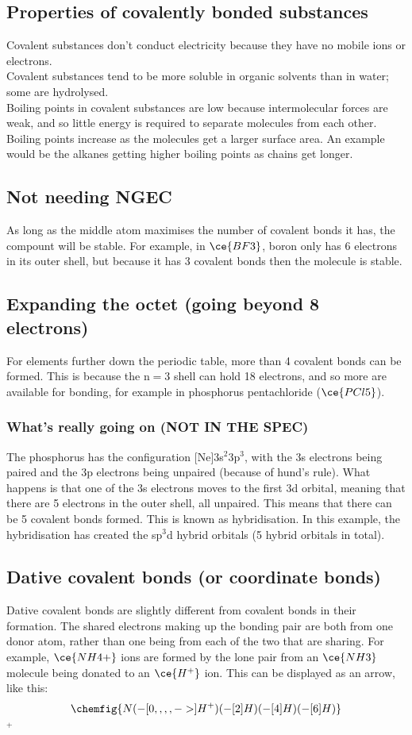 \subsection{Properties of covalently bonded substances}
Covalent substances don't conduct electricity because they have no mobile ions or electrons.
\\
Covalent substances tend to be more soluble in organic solvents than in water; some are hydrolysed.
\\
Boiling points in covalent substances are low because intermolecular forces are weak, and so little energy is required to separate molecules from each other. Boiling points increase as the molecules get a larger surface area. An example would be the alkanes getting higher boiling points as chains get longer.

\subsection{Not needing NGEC}
As long as the middle atom maximises the number of covalent bonds it has, the compount will be stable. For example, in $\ce{BF3}$, boron only has 6 electrons in its outer shell, but because it has 3 covalent bonds then the molecule is stable.
\subsection{Expanding the octet (going beyond 8 electrons)}
For elements further down the periodic table, more than 4 covalent bonds can be formed. This is because the n$=3$ shell can hold 18 electrons, and so more are available for bonding, for example in phosphorus pentachloride ($\ce{PCl5}$).
\subsubsection{What's really going on (NOT IN THE SPEC)}
The phosphorus has the configuration [Ne]3s$^2$3p$^3$, with the 3s electrons being paired and the 3p electrons being unpaired (because of hund's rule). What happens is that one of the 3s electrons moves to the first 3d orbital, meaning that there are 5 electrons in the outer shell, all unpaired. This means that there can be 5 covalent bonds formed. This is known as hybridisation. In this example, the hybridisation has created the sp$^3$d hybrid orbitals (5 hybrid orbitals in total).


\subsection{Dative covalent bonds (or coordinate bonds)}
Dative covalent bonds are slightly different from covalent bonds in their formation. The shared electrons making up the bonding pair are both from one donor atom, rather than one being from each of the two that are sharing. For example, $\ce{NH4+}$ ions are formed by the lone pair from an $\ce{NH3}$ molecule being donated to an $\ce{H^+}$ ion. This can be displayed as an arrow, like this:\\
\[\chemfig{N (-[0,,,,->]H^+) (-[2]H) (-[4]H) (-[6]H)}\]$^+$
